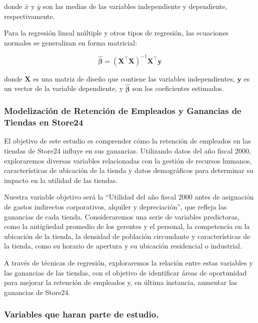 \documentclass[
]{article}
\begin{document}
donde \(\bar{x}\) y \(\bar{y}\) son las medias de las variables
independiente y dependiente, respectivamente.

Para la regresión lineal múltiple y otros tipos de regresión, las
ecuaciones normales se generalizan en forma matricial:

\begin{equation}
\mathbf{\hat{\beta}} = (\mathbf{X}^\intercal \mathbf{X})^{-1} \mathbf{X}^\intercal \mathbf{y}
\end{equation}

donde \(\mathbf{X}\) es una matriz de diseño que contiene las variables
independientes, \(\mathbf{y}\) es un vector de la variable dependiente,
y \(\mathbf{\hat{\beta}}\) son los coeficientes estimados.

\hypertarget{modelizaciuxf3n-de-retenciuxf3n-de-empleados-y-ganancias-de-tiendas-en-store24}{%
\subsubsection{Modelización de Retención de Empleados y Ganancias de
Tiendas en
Store24}\label{modelizaciuxf3n-de-retenciuxf3n-de-empleados-y-ganancias-de-tiendas-en-store24}}

El objetivo de este estudio es comprender cómo la retención de empleados
en las tiendas de Store24 influye en sus ganancias. Utilizando datos del
año fiscal 2000, exploraremos diversas variables relacionadas con la
gestión de recursos humanos, características de ubicación de la tienda y
datos demográficos para determinar su impacto en la utilidad de las
tiendas.

Nuestra variable objetivo será la ``Utilidad del año fiscal 2000 antes
de asignación de gastos indirectos corporativos, alquiler y
depreciación'', que refleja las ganancias de cada tienda. Consideraremos
una serie de variables predictoras, como la antigüedad promedio de los
gerentes y el personal, la competencia en la ubicación de la tienda, la
densidad de población circundante y características de la tienda, como
su horario de apertura y su ubicación residencial o industrial.

A través de técnicas de regresión, exploraremos la relación entre estas
variables y las ganancias de las tiendas, con el objetivo de identificar
áreas de oportunidad para mejorar la retención de empleados y, en última
instancia, aumentar las ganancias de Store24.

\hypertarget{variables-que-haran-parte-de-estudio.}{%
\subsubsection{Variables que haran parte de
estudio.}\label{variables-que-haran-parte-de-estudio.}}
\end{document}

